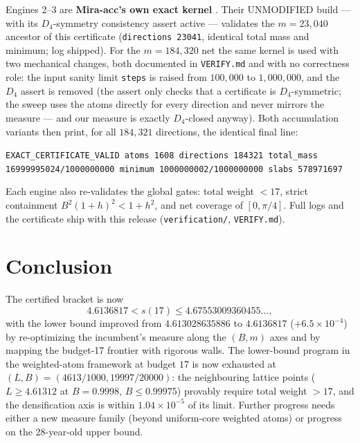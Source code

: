 \documentclass[11pt]{article}
\theoremstyle{definition}
\theoremstyle{remark}
\begin{document}
Engines 2--3 are \textbf{Mira-acc's own exact kernel} \cite{Miraacc2026}.
Their UNMODIFIED build --- with its $D_4$-symmetry consistency assert
active --- validates the $m=23{,}040$ ancestor of this certificate
(\texttt{directions 23041}, identical total mass and minimum; log
shipped). For the $m=184{,}320$ net the same kernel is used with two
mechanical changes, both documented in \texttt{VERIFY.md} and with no
correctness role: the input sanity limit \texttt{steps} is raised from
$100{,}000$ to $1{,}000{,}000$, and the $D_4$ assert is removed (the
assert only checks that a certificate is $D_4$-symmetric; the sweep uses
the atoms directly for every direction and never mirrors the measure ---
and our measure is exactly $D_4$-closed anyway). Both accumulation
variants then print, for all $184{,}321$ directions, the identical final
line:
\begin{center}
\scriptsize
\texttt{EXACT\_CERTIFICATE\_VALID atoms 1608 directions 184321 total\_mass
16999995024/1000000000 minimum 1000000002/1000000000 slabs 578971697}
\end{center}
Each engine also re-validates the global gates: total weight $<17$,
strict containment $B^2(1+h)^2<1+h^2$, and net coverage of $[0,\pi/4]$.
Full logs and the certificate ship with this release
(\texttt{verification/}, \texttt{VERIFY.md}).

\section{Conclusion}

The certified bracket is now
\[
 4.6136817<s(17)\le 4.67553009360455\ldots,
\]
with the lower bound improved from $4.613028635886$ to $4.6136817$
($+6.5\times10^{-4}$) by re-optimizing the incumbent's measure along the
$(B,m)$ axes and by mapping the budget-17 frontier with rigorous walls.
The lower-bound program in the weighted-atom framework at budget $17$ is
now exhausted at $(L,B)=(4613/1000,19997/20000)$: the neighbouring
lattice points ($L\ge4.61312$ at $B=0.9998$, $B\le0.99975$) provably
require total weight $>17$, and the densification axis is within
$1.04\times10^{-5}$ of its limit.
Further progress needs either a new measure family (beyond uniform-core
weighted atoms) or progress on the 28-year-old upper bound.
\end{document}
